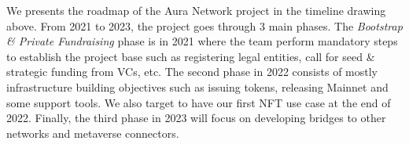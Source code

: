 \documentclass[11pt, titlepage]{article}
\begin{document}
\bigskip
\bigskip

We presents the roadmap of the Aura Network project in the timeline drawing above. From 2021 to 2023, the project goes through 3 main phases. The \emph{Bootstrap \& Private Fundraising} phase is in 2021 where the team perform mandatory steps to establish the project base such as registering legal entities, call for seed \& strategic funding from VCs, etc. The second phase in 2022 consists of mostly infrastructure building objectives such as issuing tokens, releasing Mainnet and some support tools. We also target to have our first NFT use case at the end of 2022. Finally, the third phase in 2023 will focus on developing bridges to other networks and metaverse connectors.





\end{document}
